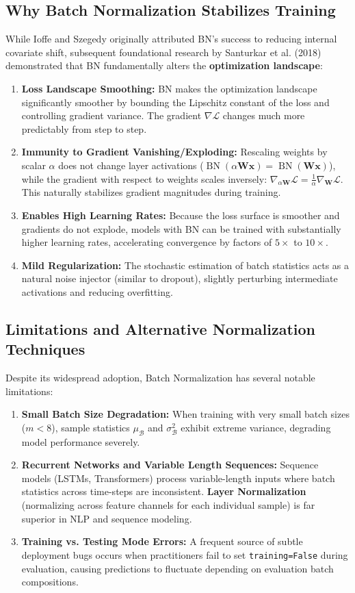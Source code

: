 \documentclass[12pt,a4paper]{article}
\begin{document}
\subsection{Why Batch Normalization Stabilizes Training}
While Ioffe and Szegedy originally attributed BN's success to reducing internal covariate shift, subsequent foundational research by Santurkar et al. (2018) demonstrated that BN fundamentally alters the \textbf{optimization landscape}:
\begin{enumerate}[leftmargin=*]
    \item \textbf{Loss Landscape Smoothing:} BN makes the optimization landscape significantly smoother by bounding the Lipschitz constant of the loss and controlling gradient variance. The gradient $\nabla \mathcal{L}$ changes much more predictably from step to step.
    \item \textbf{Immunity to Gradient Vanishing/Exploding:} Rescaling weights by scalar $\alpha$ does not change layer activations ($\operatorname{BN}(\alpha \mathbf{W} \mathbf{x}) = \operatorname{BN}(\mathbf{W}\mathbf{x})$), while the gradient with respect to weights scales inversely: $\nabla_{\alpha \mathbf{W}} \mathcal{L} = \frac{1}{\alpha} \nabla_{\mathbf{W}} \mathcal{L}$. This naturally stabilizes gradient magnitudes during training.
    \item \textbf{Enables High Learning Rates:} Because the loss surface is smoother and gradients do not explode, models with BN can be trained with substantially higher learning rates, accelerating convergence by factors of $5\times$ to $10\times$.
    \item \textbf{Mild Regularization:} The stochastic estimation of batch statistics acts as a natural noise injector (similar to dropout), slightly perturbing intermediate activations and reducing overfitting.
\end{enumerate}

\subsection{Limitations and Alternative Normalization Techniques}
Despite its widespread adoption, Batch Normalization has several notable limitations:
\begin{enumerate}[leftmargin=*]
    \item \textbf{Small Batch Size Degradation:} When training with very small batch sizes ($m < 8$), sample statistics $\mu_{\mathcal{B}}$ and $\sigma^2_{\mathcal{B}}$ exhibit extreme variance, degrading model performance severely.
    \item \textbf{Recurrent Networks and Variable Length Sequences:} Sequence models (LSTMs, Transformers) process variable-length inputs where batch statistics across time-steps are inconsistent. \textbf{Layer Normalization} (normalizing across feature channels for each individual sample) is far superior in NLP and sequence modeling.
    \item \textbf{Training vs. Testing Mode Errors:} A frequent source of subtle deployment bugs occurs when practitioners fail to set \texttt{training=False} during evaluation, causing predictions to fluctuate depending on evaluation batch compositions.
\end{enumerate}
\end{document}
